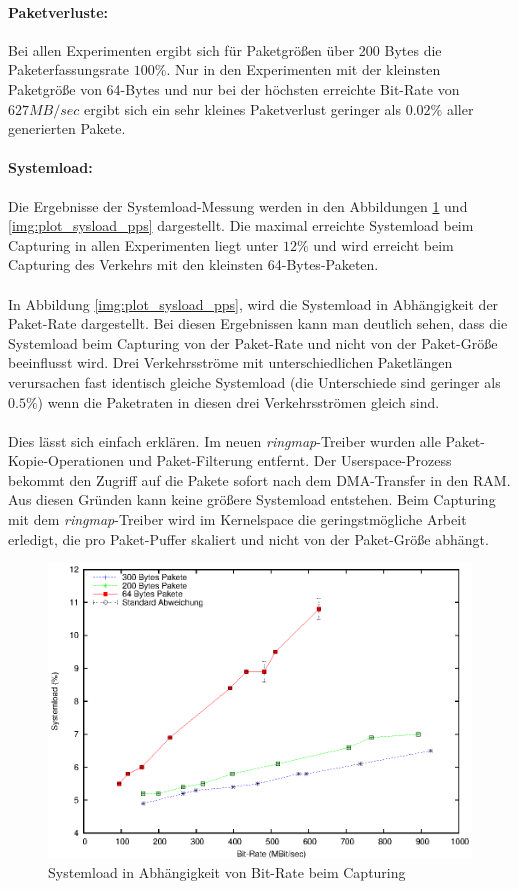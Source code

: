 \paragraph*{Paketverluste:} Bei allen Experimenten ergibt sich für Paketgrößen
über 200 Bytes die Paketerfassungsrate $100\%$. Nur in den Experimenten mit der
kleinsten Paketgröße von 64-Bytes und nur bei der höchsten erreichte Bit-Rate
von $627 MB/sec$ ergibt sich ein sehr kleines Paketverlust geringer als
$0.02\%$ aller generierten Pakete.
%
\paragraph*{Systemload:}
Die Ergebnisse der Systemload-Messung werden in den Abbildungen
\ref{img:plot_sysload_mbs} und \ref{img:plot_sysload_pps} dargestellt. Die
maximal erreichte Systemload beim Capturing in allen Experimenten liegt unter
$12\%$ und wird erreicht beim Capturing des Verkehrs mit den kleinsten
64-Bytes-Paketen.\\\\
%
In Abbildung \ref{img:plot_sysload_pps}, wird die Systemload in Abhängigkeit
der Paket-Rate dargestellt. Bei diesen Ergebnissen kann man deutlich sehen,
dass die Systemload beim Capturing von der Paket-Rate und nicht von der
Paket-Größe beeinflusst wird. Drei Verkehrsströme mit unterschiedlichen
Paketlängen verursachen fast identisch gleiche Systemload (die Unterschiede
sind geringer als $0.5\%$) wenn die Paketraten in diesen drei Verkehrsströmen
gleich sind.\\\\
Dies lässt sich einfach erklären. Im neuen \emph{ringmap}-Treiber wurden alle
Paket-Kopie-Operationen und Paket-Filterung entfernt. Der Userspace-Prozess
bekommt den Zugriff auf die Pakete sofort nach dem DMA-Transfer in den RAM. Aus
diesen Gründen kann keine größere Systemload entstehen. Beim Capturing mit dem
\emph{ringmap}-Treiber wird im Kernelspace die geringstmögliche Arbeit erledigt,
die pro Paket-Puffer skaliert und nicht von der Paket-Größe abhängt.
%
\begin{figure} 
\centering \includegraphics[width=5.5in]{plots/graphs/sysload_single_CPU_pcie_mbs}
\caption{Systemload in Abhängigkeit von Bit-Rate beim Capturing}
\label{img:plot_sysload_mbs}
\end{figure}
